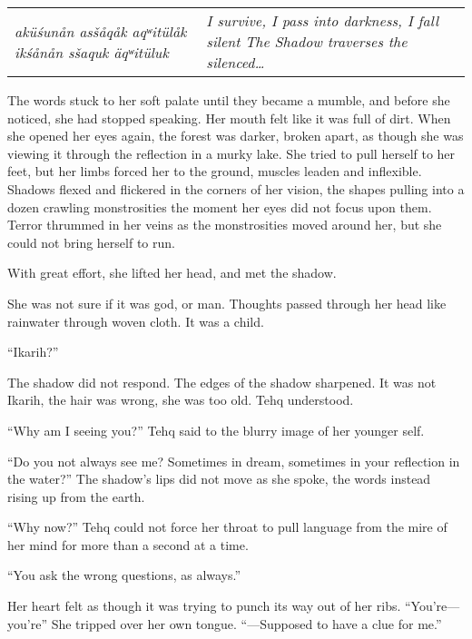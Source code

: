 \vspace{1em}

\setlength{\tabcolsep}{3pt}
\noindent\begin{tabular}{p{} p{}}
\noindent\emph{aküśunån asšåqåk aqʷitülåk} \newline \emph{ikśånån sšaquk äqʷitüluk}
&
\noindent\emph{I survive, I pass into darkness, I fall silent} \newline \emph{The Shadow traverses the silenced\ldots{}}
\end{tabular}

\vspace{1em}

The words stuck to her soft palate until they became a mumble, and before she noticed, she had stopped speaking. Her mouth felt like it was full of dirt. When she opened her eyes again, the forest was darker, broken apart, as though she was viewing it through the reflection in a murky lake. She tried to pull herself to her feet, but her limbs forced her to the ground, muscles leaden and inflexible. Shadows flexed and flickered in the corners of her vision, the shapes pulling into a dozen crawling monstrosities the moment her eyes did not focus upon them. Terror thrummed in her veins as the monstrosities moved around her, but she could not bring herself to run.

With great effort, she lifted her head, and met the shadow.

She was not sure if it was god, or man. Thoughts passed through her head like rainwater through woven cloth. It was a child.

``Ikarih?''

The shadow did not respond. The edges of the shadow sharpened. It was not Ikarih, the hair was wrong, she was too old. Tehq understood.

``Why am I seeing you?'' Tehq said to the blurry image of her younger self.

``Do you not always see me? Sometimes in dream, sometimes in your reflection in the water?'' The shadow's lips did not move as she spoke, the words instead rising up from the earth.

``Why now?'' Tehq could not force her throat to pull language from the mire of her mind for more than a second at a time.

``You ask the wrong questions, as always.''

Her heart felt as though it was trying to punch its way out of her ribs. ``You're---you're'' She tripped over her own tongue. ``---Supposed to have a clue for me.''

